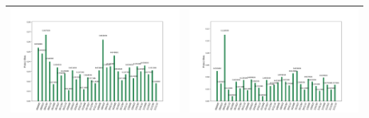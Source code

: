 \begin{landscape}
\begin{table}[ht]
\begin{tabular}{c c}
        \includegraphics[scale=0.32]{Grover_results/Grover_n=5,m=11.png} & \includegraphics[scale=0.32]{Grover_results/Grover_n=5,m=12.png} \\ \hline
    \end{tabular}
\end{table}
\end{landscape}
